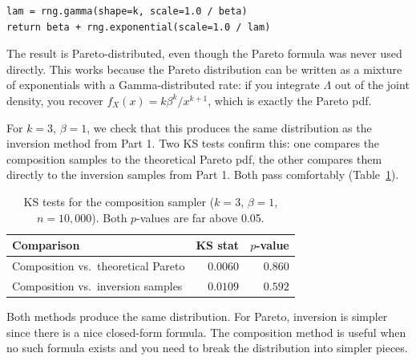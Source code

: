 \begin{verbatim}
lam = rng.gamma(shape=k, scale=1.0 / beta)
return beta + rng.exponential(scale=1.0 / lam)
\end{verbatim}

The result is Pareto-distributed, even though the Pareto formula was never
used directly. This works because the Pareto distribution can be written as a
mixture of exponentials with a Gamma-distributed rate: if you integrate
$\Lambda$ out of the joint density, you recover $f_X(x) = k\beta^k / x^{k+1}$,
which is exactly the Pareto pdf.

For $k = 3$, $\beta = 1$, we check that this produces the same distribution
as the inversion method from Part 1. Two KS tests confirm this: one compares
the composition samples to the theoretical Pareto pdf, the other compares
them directly to the inversion samples from Part 1. Both pass comfortably
(Table~\ref{tab:composition}).

\begin{table}[h]
    \centering
    \caption{KS tests for the composition sampler ($k = 3$, $\beta = 1$,
             $n = 10{,}000$). Both $p$-values are far above 0.05.}
    \label{tab:composition}
    \renewcommand{\arraystretch}{1.1}
    \begin{tabular}{lrr}
        \toprule
        Comparison                          & KS stat & $p$-value \\
        \midrule
        Composition vs.\ theoretical Pareto & $0.0060$ & $0.860$ \\
        Composition vs.\ inversion samples  & $0.0109$ & $0.592$ \\
        \bottomrule
    \end{tabular}
\end{table}

Both methods produce the same distribution. For Pareto, inversion is simpler
since there is a nice closed-form formula. The composition method is useful
when no such formula exists and you need to break the distribution into
simpler pieces.